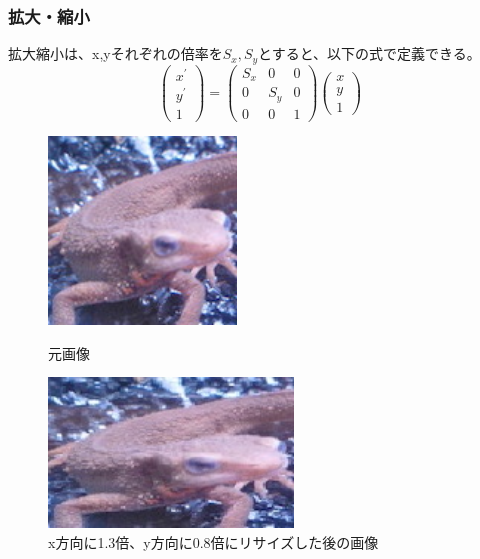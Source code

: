    \subsubsection{拡大・縮小}
        拡大縮小は、x,yそれぞれの倍率を$S_x, S_y$とすると、以下の式で定義できる。
        \begin{equation}
            \left(\begin{array}{l}
            x^{\prime} \\
            y^{\prime} \\
            1
            \end{array}\right)
            =
            \left(\begin{array}{lll}
            S_x & 0 & 0\\
            0 & S_y & 0\\
            0 & 0 & 1
            \end{array}\right)
            \left(\begin{array}{l}
            x \\
            y \\
            1
            \end{array}\right)
        \end{equation}
        \begin{figure}[htbp]
            \begin{minipage}{0.5\hsize}
                \begin{center}
                    \includegraphics[width=50mm]{./8_appendix/img/imori.jpg}
                \end{center}
                \caption{元画像}
            \end{minipage}
            \begin{minipage}{0.5\hsize}
                \begin{center}
                    \includegraphics[width=65mm]{./8_appendix/img/imori_Scale.jpg}
                \end{center}
                \caption{x方向に1.3倍、y方向に0.8倍にリサイズした後の画像}
            \end{minipage}
        \end{figure}

